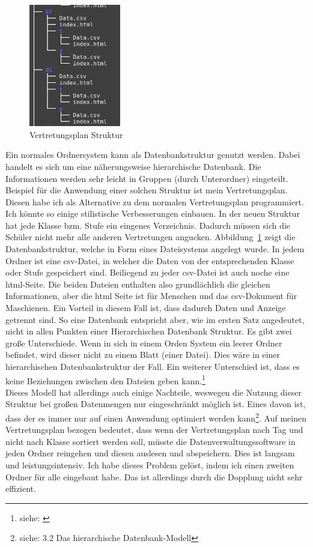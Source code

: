 \documentclass[a4paper, 12pt]{article}
\theoremstyle{plain}
\theoremstyle{definition}
\begin{document}
	\begin{figure}
	\vspace{-13pt}
	\includegraphics[width=4cm]{vertretungTree.png}
	\vspace{-30pt}
	\caption{Vertre\-tungsplan Struktur}\label{fig:verTree}
	\end{figure}
	Ein normales Ordnersystem kann als Datenbankstruktur genutzt werden. Dabei handelt es sich um eine näherungsweise hierarchische Datenbank. Die Informationen werden sehr leicht in Gruppen (durch Unterordner) eingeteilt. Beispiel für die Anwendung einer solchen Struktur ist mein Vertretungsplan. Diesen habe ich als Alternative zu dem normalen Vertretungsplan programmiert. Ich könnte so einige stilistische Verbesserungen einbauen. In der neuen Struktur hat jede Klasse bzm. Stufe ein eingenes Verzeichnis. Dadurch müssen sich die Schüler nicht mehr alle anderen Vertretungen angucken.  Abbildung~\ref{fig:verTree} zeigt die Datenbankstruktur, welche in Form eines Dateisystems angelegt wurde. In jedem Ordner ist eine csv-Datei, in welcher die Daten von der entsprechenden Klasse oder Stufe gespeichert sind. Beiliegend zu jeder csv-Datei ist auch noche eine html-Seite. Die beiden Dateien enthalten also grundlächlich die gleichen Informationen, aber die html Seite ist für Menschen und das csv-Dokument für Maschienen. Ein Vorteil in diesem Fall ist, dass dadurch Daten und Anzeige getrennt sind. So eine Datenbank entspricht aber, wie im ersten Satz angedeutet, nicht in allen Punkten einer Hierarchischen Datenbank Struktur. Es gibt zwei große Unterschiede. Wenn in sich in einem Orden System ein leerer Ordner befindet, wird dieser nicht zu einem Blatt (einer Datei). Dies wäre in einer hierarchischen Datenbankstruktur der Fall. Ein weiterer Unterschied ist, dass es keine Beziehungen zwischen den Dateien geben kann.\footnote{siehe: \cite{hierDbWiki}}\\
Dieses Modell hat allerdings auch einige Nachteile, weswegen die Nutzung dieser Struktur bei großen Datenmengen nur eingeschränkt möglich ist. Eines davon ist, dass der es immer nur auf einen Anwendung optimiert werden kann\footnote{siehe: \cite{Jarosch2010} 3.2 Das hierarchische Datenbank-Modell}. Auf meinen Vertretungsplan bezogen bedeutet, dass wenn der Vertretungsplan nach Tag und nicht nach Klasse sortiert werden soll, müsste die Datenverwaltungssoftware in jeden Ordner reingehen und diesen auslesen und abspeichern. Dies ist langsam und leistungsintensiv. Ich habe dieses Problem gelöst, indem ich einen zweiten Ordner für alle eingebaut habe. Das ist allerdings durch die Dopplung nicht sehr effizient. 
\end{document}
